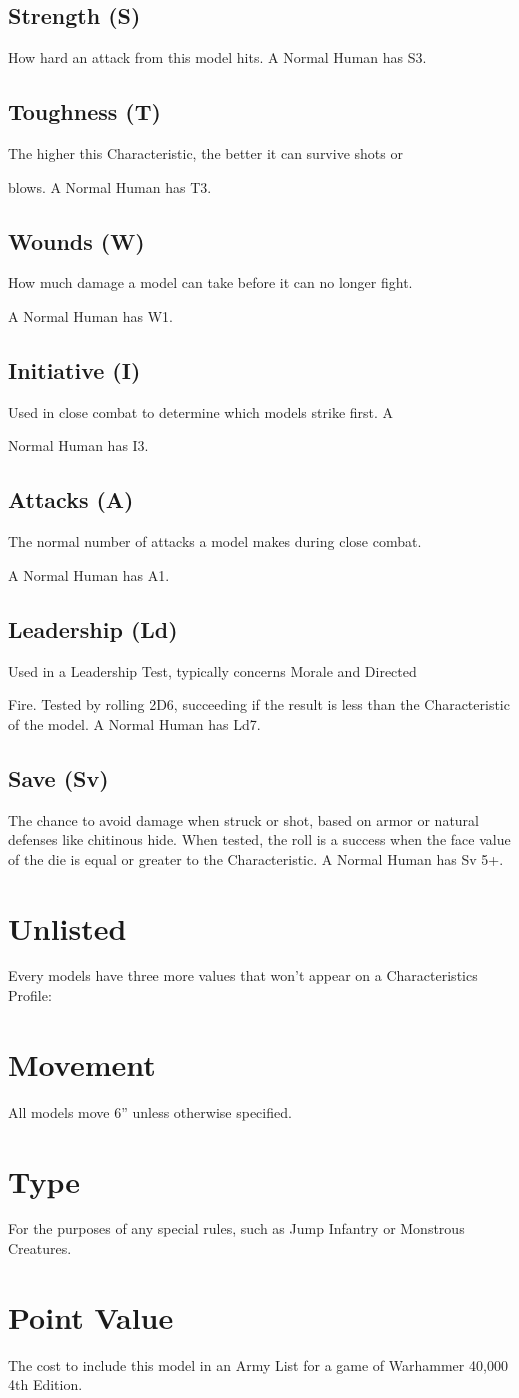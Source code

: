 \subsection{Strength (S)}
How hard an attack from this model hits. A Normal Human has S3.

\subsection{Toughness (T)}
The higher this Characteristic, the better it can survive shots or

blows. A Normal Human has T3.
\subsection{Wounds (W)}
How much damage a model can take before it can no longer fight.

A Normal Human has W1.
\subsection{Initiative (I)}
Used in close combat to determine which models strike first. A

Normal Human has I3.
\subsection{Attacks (A)}
The normal number of attacks a model makes during close combat.

A Normal Human has A1.
\subsection{Leadership (Ld)}
Used in a Leadership Test, typically concerns Morale and Directed

Fire. Tested by rolling 2D6, succeeding if the result is less than the
Characteristic of the model. A Normal Human has Ld7.
\subsection{Save (Sv)}

The chance to avoid damage when struck or shot, based on armor
or natural defenses like chitinous hide. When tested, the roll is a
success when the face value of the die is equal or greater to the
Characteristic. A Normal Human has Sv 5+.


\section{Unlisted}
Every models have three more values that won’t appear on a
Characteristics Profile:

\section{Movement}
All models move 6” unless otherwise specified.

\section{Type}
For the purposes of any special rules, such as Jump Infantry or
Monstrous Creatures.

\section{Point Value}
The cost to include this model in an Army List for a game of
Warhammer 40,000 4th Edition.

